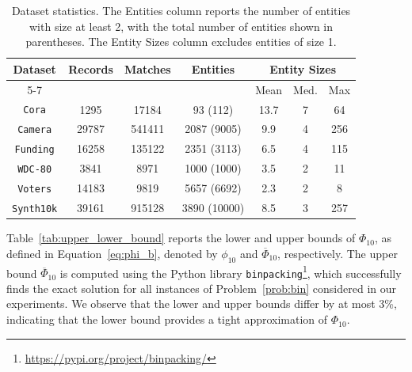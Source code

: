 \documentclass[sigconf, nonacm]{acmart}
\newcommand{\cora}{\texttt{Cora}\xspace}
\newcommand{\camera}{\texttt{Camera}\xspace}
\newcommand{\funding}{\texttt{Funding}\xspace}
\newcommand{\voters}{\texttt{Voters}\xspace}
\newcommand{\wdc}{\texttt{WDC-80}\xspace}
\newcommand{\synth}{\texttt{Synth10k}\xspace}
\begin{document}
\setlength{\tabcolsep}{3pt}
{\small
\begin{table}[!h]
    \centering
    \begin{tabular}{|c|c|c|c|c|c|c|}
        \hline
        \multirow{2}{*}{Dataset} & \multirow{2}{*}{Records} & \multirow{2}{*}{Matches} & \multirow{2}{*}{Entities} & \multicolumn{3}{c|}{Entity Sizes} \\
        \cline{5-7}
        & & & & Mean & Med. & Max \\
        \hline
        \cora & 1295 & 17184 & 93 (112) & 13.7 & 7  & 64\\
        \camera & 29787  & 541411 & 2087 (9005) & 9.9  & 4  & 256   \\
        \funding & 16258  & 135122 & 2351 (3113) & 6.5  & 4  & 115   \\
        \wdc & 3841  & 8971 & 1000 (1000) & 3.5  & 2  & 11  \\
        \voters & 14183  & 9819 & 5657 (6692) & 2.3  & 2   & 8   \\
        \hdashline
        \synth & 39161  & 915128  & 3890 (10000) & 8.5 & 3  & 257   \\
        

        \hline
    \end{tabular}
    \caption{Dataset statistics. The Entities column reports the number of entities with size at least 2, with the total number of entities shown in parentheses. The Entity Sizes column excludes entities of size 1.}
    \label{tab:dataset_table}
\end{table}
}

Table~\ref{tab:upper_lower_bound} reports the lower and upper bounds of $\Phi_{10}$, as defined in Equation~\ref{eq:phi_b}, denoted by $\phi_{10}$ and $\overline{\Phi}_{10}$, respectively. 
The upper bound $\overline{\Phi}_{10}$ is computed using the Python library \texttt{binpacking}\footnote{\url{https://pypi.org/project/binpacking/}}, which successfully finds the exact solution for all instances of Problem~\ref{prob:bin} considered in our experiments. 
We observe that the lower and upper bounds differ by at most 3\%, indicating that the lower bound provides a tight approximation of $\Phi_{10}$.
\end{document}
